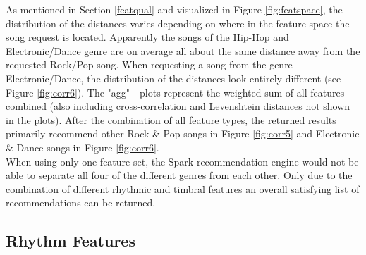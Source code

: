\noindent As mentioned in Section \ref{featqual} and visualized in Figure \ref{fig:featspace}, the distribution of the distances varies depending on where in the feature space the song request is located. Apparently the songs of the Hip-Hop and Electronic/Dance genre are on average all about the same distance away from the requested Rock/Pop song. When requesting a song from the genre Electronic/Dance, the distribution of the distances look entirely different (see Figure \ref{fig:corr6}).
\noindent The "agg" - plots represent the weighted sum of all features combined (also including cross-correlation and Levenshtein distances not shown in the plots). After the combination of all feature types, the returned results primarily recommend other Rock \& Pop songs in Figure \ref{fig:corr5} and Electronic \& Dance songs in Figure \ref{fig:corr6}.\\
When using only one feature set, the Spark recommendation engine would not be able to separate all four of the different genres from each other. Only due to the combination of different rhythmic and timbral features an overall satisfying list of recommendations can be returned.\\

\subsection{Rhythm Features}\label{rhythmrec}

